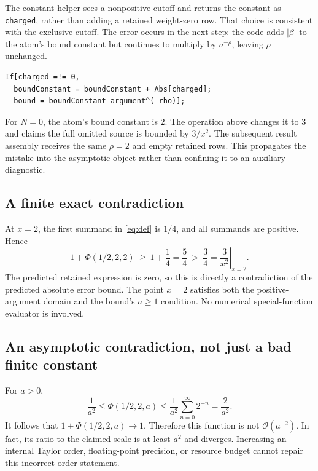 \documentclass[11pt,letterpaper]{article}
\newcommand{\code}[1]{\nolinkurl{#1}}
\newcommand{\OO}{\mathcal{O}}
\begin{document}
The constant helper sees a nonpositive cutoff and returns the constant as
\code{charged}, rather than adding a retained weight-zero row. That choice
is consistent with the exclusive cutoff. The error occurs in the next step:
the code adds $|\beta|$ to the atom's bound constant but continues to multiply
by $a^{-\rho}$, leaving $\rho$ unchanged.\cite{dirichlet}
\begin{lstlisting}
If[charged =!= 0,
  boundConstant = boundConstant + Abs[charged];
  bound = boundConstant argument^(-rho)];
\end{lstlisting}
For $N=0$, the atom's bound constant is $2$. The operation above changes it to
$3$ and claims the full omitted source is bounded by $3/x^2$.
The subsequent result assembly receives the same $\rho=2$ and empty retained
rows. This propagates the mistake into the asymptotic object rather than
confining it to an auxiliary diagnostic.\cite{dirichlet}

\subsection{A finite exact contradiction}
At $x=2$, the first summand in \eqref{eq:def} is $1/4$, and all summands are
positive. Hence
\begin{equation}
 1+\Phi(1/2,2,2)\ \ge\ 1+\frac14=\frac54
 \ >\ \frac34=\left.\frac3{x^2}\right|_{x=2}.
\end{equation}
The predicted retained expression is zero, so this is directly a contradiction
of the predicted absolute error bound. The point $x=2$ satisfies both the
positive-argument domain and the bound's $a\ge1$ condition. No numerical
special-function evaluator is involved.

\subsection{An asymptotic contradiction, not just a bad finite constant}
For $a>0$,
\begin{equation}
 \frac1{a^2}\le\Phi(1/2,2,a)
 \le\frac1{a^2}\sum_{n=0}^{\infty}2^{-n}=\frac2{a^2}.
\end{equation}
It follows that $1+\Phi(1/2,2,a)\to1$. Therefore this function is not
$\OO(a^{-2})$. In fact, its ratio to the claimed scale is at least $a^2$ and
diverges. Increasing an internal Taylor order, floating-point precision, or
resource budget cannot repair this incorrect order statement.
\end{document}
